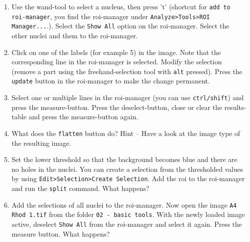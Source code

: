 \begin{enumerate}
\item Use the wand-tool to select a nucleus, then press 't' (shortcut for \texttt{add to roi-manager}, you find the roi-manager under \texttt{Analyze>Tools>ROI Manager...}.). Select the \texttt{Show All} option on the roi-manager. Select the other nuclei and them to the roi-manager.
\item Click on one of the labels (for example 5) in the image. Note that the corresponding line in the roi-manager is selected. Modify the selection (remove a part using the freehand-selection tool with \texttt{alt} pressed). Press the \texttt{update} button in the roi-manager to make the change permanent.
\item Select one or multiple lines in the roi-manager (you can use \texttt{ctrl/shift}) and press the measure-button. Press the deselect-button, close or clear the results-table and press the measure-button again.
\item What does the \texttt{flatten} button do? Hint – Have a look at the image type of the resulting image.

\fbox{
	\begin{minipage}{\linewidth}
		\hfill\vspace{2cm}
	\end{minipage}
	}
	
\item Set the lower threshold so that the background becomes blue and there are no holes in the
nuclei. You can create a selection from the thresholded values by using \texttt{Edit>Selection>Create Selection}. Add the roi to the roi-manager and run the \texttt{split} command. What happens?

\fbox{
	\begin{minipage}{\linewidth}
		\hfill\vspace{2cm}
	\end{minipage}
	}
	
\item Add the selections of all nuclei to the roi-manager. Now open the image \texttt{A4 Rhod 1.tif} from the folder \texttt{02 - basic tools}. With the newly loaded image active, deselect \texttt{Show All} from the roi-manager and select it again. Press the measure button. What happens?

\fbox{
	\begin{minipage}{\linewidth}
		\hfill\vspace{2cm}
	\end{minipage}
	}
	
\end{enumerate}

